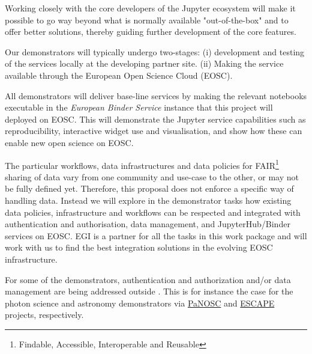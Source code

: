 \begin{workpackage}
\begin{wpdescription}
  Working closely with the core developers of the Jupyter ecosystem will make it possible to
  go way beyond what is normally available "out-of-the-box" and to offer better solutions,
  thereby guiding further development of the core features.

  \medskip
  Our demonstrators will typically undergo two-stages: (i)
  development and testing of the services locally at the developing partner
  site. (ii) Making the service available through the European Open
  Science Cloud (EOSC).

  All demonstrators will deliver base-line services by making the
  relevant notebooks executable in the \emph{European Binder Service} instance that this
  project will deployed on EOSC. This will demonstrate
  the Jupyter service capabilities such as reproducibility, interactive
  widget use and visualisation, and show how these can
  enable new open science on EOSC.

  The particular workflows, data infrastructures and data policies for
  FAIR\footnote{Findable, Accessible, Interoperable and Reusable} sharing of data vary from one community and use-case to
  the other, or may not be fully defined yet. Therefore, this proposal
  does not enforce a specific way of handling data. Instead we
  will explore in the demonstrator tasks how existing data policies,
  infrastructure and workflows can be respected and integrated with
  authentication and authorisation, data management, and
  JupyterHub/Binder services on EOSC. EGI is a partner
  for all the tasks in this work package and will work with us to find the
  best integration solutions in the evolving EOSC
  infrastructure.

  For some of the demonstrators, authentication and authorization and/or
  data management are being addressed outside \TheProject.
  This is for instance the case for the photon science and astronomy
  demonstrators via \href{https://panosc-eu.github.io/}{PaNOSC} and
  \href{https://www.eso.org/public/announcements/ann18084/}{ESCAPE} projects, respectively.

\end{wpdescription}

\begin{tasklist}
% 








\end{tasklist}




\end{workpackage}
